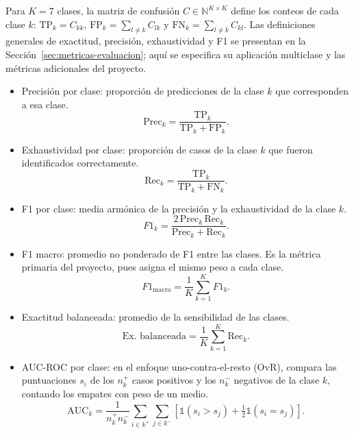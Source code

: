 Para $K=7$ clases, la matriz de confusión $C\in\mathbb{N}^{K\times K}$ define los conteos de cada clase $k$: $\mathrm{TP}_k=C_{kk}$, $\mathrm{FP}_k=\sum_{l\neq k}C_{lk}$ y $\mathrm{FN}_k=\sum_{l\neq k}C_{kl}$. Las definiciones generales de exactitud, precisión, exhaustividad y F1 se presentan en la Sección~\ref{sec:metricas-evaluacion}; aquí se especifica su aplicación multiclase y las métricas adicionales del proyecto.

\begin{itemize}[label={\raisebox{0.15ex}{\rule{0.45ex}{0.45ex}}},leftmargin=1.5em,labelsep=0.6em,itemsep=0.4\baselineskip,topsep=0.3\baselineskip]
\item Precisión por clase: proporción de predicciones de la clase $k$ que corresponden a esa clase.
\begin{equation}
 \mathrm{Prec}_k=\frac{\mathrm{TP}_k}{\mathrm{TP}_k+\mathrm{FP}_k}.
\end{equation}

\item Exhaustividad por clase: proporción de casos de la clase $k$ que fueron identificados correctamente.
\begin{equation}
 \mathrm{Rec}_k=\frac{\mathrm{TP}_k}{\mathrm{TP}_k+\mathrm{FN}_k}.
\end{equation}

\item F1 por clase: media armónica de la precisión y la exhaustividad de la clase $k$.
\begin{equation}
 F1_k=\frac{2\,\mathrm{Prec}_k\,\mathrm{Rec}_k}{\mathrm{Prec}_k+\mathrm{Rec}_k}.
\end{equation}

\item F1 macro: promedio no ponderado de F1 entre las clases. Es la métrica primaria del proyecto, pues asigna el mismo peso a cada clase.
\begin{equation}
 F1_{\mathrm{macro}}=\frac{1}{K}\sum_{k=1}^{K}F1_k.
\end{equation}

\item Exactitud balanceada: promedio de la sensibilidad de las clases.
\begin{equation}
 \text{Ex. balanceada}=\frac{1}{K}\sum_{k=1}^{K}\mathrm{Rec}_k.
\end{equation}

\item AUC-ROC por clase: en el enfoque uno-contra-el-resto (OvR), compara las puntuaciones $s_i$ de los $n_k^+$ casos positivos y los $n_k^-$ negativos de la clase $k$, contando los empates con peso de un medio.
\begin{equation}
 \mathrm{AUC}_k=\frac{1}{n_k^{+}n_k^{-}}\sum_{i\in k^{+}}\sum_{j\in k^{-}}\left[\mathbb{1}(s_i>s_j)+\tfrac{1}{2}\mathbb{1}(s_i=s_j)\right].
\end{equation}


\end{itemize}
